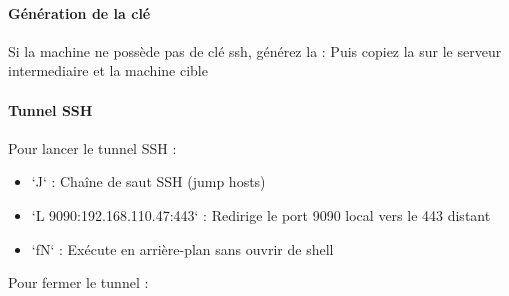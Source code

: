 \documentclass{article}
\begin{document}
\paragraph{Génération de la clé\\}
Si la machine ne possède pas de clé ssh, générez la :
Puis copiez la sur le serveur intermediaire et la machine cible 

\paragraph{Tunnel SSH\\}

Pour lancer le tunnel SSH :
\begin{itemize}
	\item `J` : Chaîne de saut SSH (jump hosts)
	\item  `L 9090:192.168.110.47:443` : Redirige le port 9090 local vers le 443 distant
	\item `fN` : Exécute en arrière-plan sans ouvrir de shell
\end{itemize}

Pour fermer le tunnel : 
\end{document}
